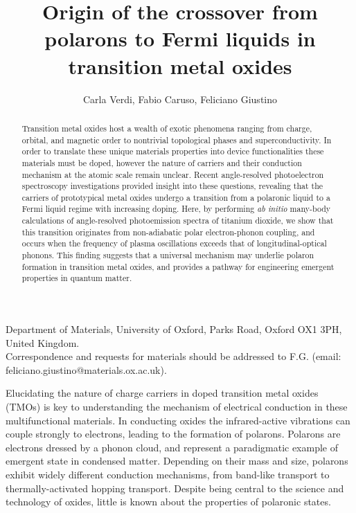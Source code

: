 \documentclass[12pt]{nature}
\begin{document}
\title{Origin of the crossover from polarons to Fermi liquids in transition metal oxides}
\author{Carla Verdi, Fabio Caruso, Feliciano Giustino}

\maketitle 

\vspace*{-0.2cm} 
\begin{affiliations} 
\item[] Department of Materials, University of Oxford, Parks Road, Oxford OX1 3PH, United Kingdom.
\\ \small \normalfont Correspondence and requests for materials should be addressed to 
F.G. (email: feliciano.giustino@materials.ox.ac.uk).
\end{affiliations} 
 
 
\begin{abstract} 
Transition metal oxides host a wealth of exotic phenomena ranging from charge, 
orbital, and magnetic order to nontrivial topological phases and superconductivity. In order to translate 
these unique materials properties into device functionalities these materials 
must be doped, however the nature of carriers and their conduction mechanism at the 
atomic scale remain unclear. Recent angle-resolved photoelectron spectroscopy investigations provided 
insight into these questions, revealing that the carriers of prototypical metal oxides undergo a 
transition from a polaronic liquid to a Fermi liquid regime with increasing doping. 
Here, by performing \textit{ab initio} many-body calculations of angle-resolved 
photoemission spectra of titanium dioxide, we show that this transition originates from 
non-adiabatic polar electron-phonon coupling, and occurs when the frequency of plasma oscillations 
exceeds that of longitudinal-optical phonons. This finding suggests that a universal mechanism may 
underlie polaron formation in transition metal oxides, and provides a pathway 
for engineering emergent properties in quantum matter.
\end{abstract}
\vspace{0.3cm} 

Elucidating the nature of charge carriers in doped transition metal oxides (TMOs) is key 
to understanding the mechanism of electrical conduction in these multifunctional materials. In 
conducting oxides the infrared-active vibrations can couple strongly to electrons, leading to the 
formation of polarons\cite{Devreese2009}. Polarons are electrons dressed by a phonon cloud\cite{Mahan}, 
and represent a paradigmatic example of emergent state in condensed matter.
Depending on their mass and size, polarons exhibit widely different conduction 
mechanisms, from band-like transport to thermally-activated hopping transport\cite{Mott1969, Ziman}. 
Despite being central to the science and technology of oxides, little is known about the 
properties of polaronic states.
\end{document}
